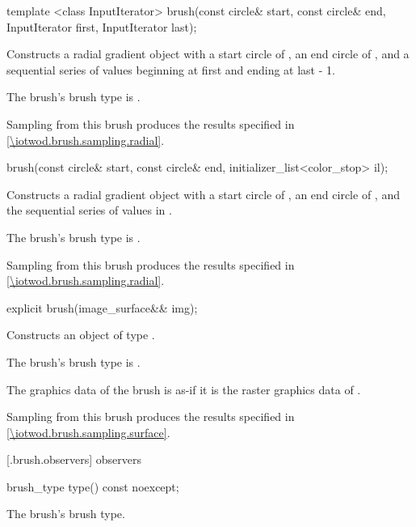 %
\begin{itemdecl}
template <class InputIterator>
brush(const circle& start, const circle& end,
  InputIterator first, InputIterator last);
\end{itemdecl}
\begin{itemdescr}
\pnum
\effects
Constructs a radial gradient  object with a start circle of , an end circle of ,  and a sequential series of  values beginning at {first} and ending at {last - 1}.

\pnum
The brush's brush type is .

\pnum
\remarks
Sampling from this brush produces the results specified in \ref{\iotwod.brush.sampling.radial}.
\end{itemdescr}

%
\begin{itemdecl}
brush(const circle& start, const circle& end,
  initializer_list<color_stop> il);
\end{itemdecl}
\begin{itemdescr}
\pnum
\effects
Constructs a radial gradient  object with a start circle of , an end circle of , and the sequential series of  values in .

\pnum
The brush's brush type is .

\pnum
\remarks
Sampling from this brush produces the results specified in \ref{\iotwod.brush.sampling.radial}.
\end{itemdescr}

%
\begin{itemdecl}
explicit brush(image_surface&& img);
\end{itemdecl}
\begin{itemdescr}
\pnum
\pnum
\effects
Constructs an object of type .

\pnum
The brush's brush type is .

\pnum
The graphics data of the brush is as-if it is the raster graphics data of .

\pnum
\remarks
Sampling from this brush produces the results specified in \ref{\iotwod.brush.sampling.surface}.
\end{itemdescr}

 [\iotwod.brush.observers]{ observers}

%
\begin{itemdecl}
brush_type type() const noexcept;
\end{itemdecl}
\begin{itemdescr}
\pnum
\returns
The brush's brush type.
\end{itemdescr}
